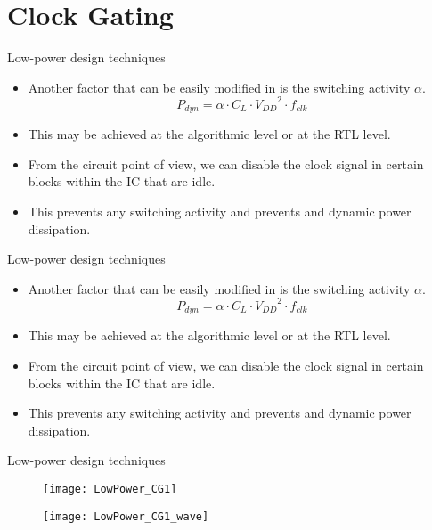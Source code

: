 \documentclass[]{slides}
\begin{document}
\section{Clock Gating}
\begin{frame}{Low-power design techniques}{}
\begin{itemize}
\item Another factor that can be easily modified in  is the switching activity $\alpha$.
\begin{equation*}
P_{dyn} = \alpha \cdot C_{L} \cdot {V_{DD}}^{2} \cdot f_{clk}
\end{equation*}
\item This may be achieved at the algorithmic level or at the \ac{RTL} level.
\item From the circuit point of view, we can disable the clock signal in certain blocks within the \ac{IC} that are idle.\\
\item This prevents any switching activity  and prevents and dynamic power dissipation.
\end{itemize}
\end{frame}

\begin{frame}{Low-power design techniques}{}
\begin{itemize}
\item Another factor that can be easily modified in  is the switching activity $\alpha$.
\begin{equation*}
P_{dyn} = \alpha \cdot C_{L} \cdot {V_{DD}}^{2} \cdot f_{clk}
\end{equation*}
\item This may be achieved at the algorithmic level or at the \ac{RTL} level.
\item From the circuit point of view, we can disable the clock signal in certain blocks within the \ac{IC} that are idle.\\
\item This prevents any switching activity  and prevents and dynamic power dissipation.
\end{itemize}
\end{frame}

\begin{frame}{Low-power design techniques}{}
\vspace{-5pt}
\begin{figure}
\texttt{[image: LowPower\_CG1]}
\end{figure}
\vspace{-15pt}
\begin{figure}
\texttt{[image: LowPower\_CG1\_wave]}
\end{figure}
\end{frame}
\end{document}
